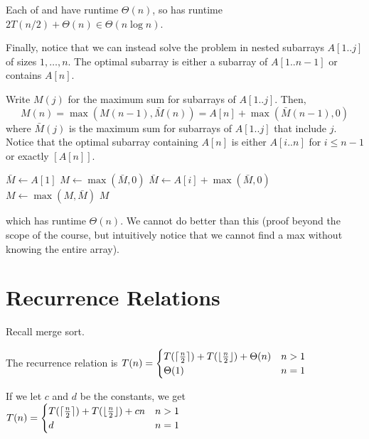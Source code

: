 Each of  and  have runtime $\Theta(n)$,
so  has runtime $2T(n/2) + \Theta(n) \in \Theta(n\log n)$.

Finally, notice that we can instead solve the problem in nested subarrays $A[1..j]$ of sizes $1,\dotsc,n$.
The optimal subarray is either a subarray of $A[1..n-1]$ or contains $A[n]$.

Write $M(j)$ for the maximum sum for subarrays of $A[1..j]$. Then,
\[ M(n) = \max(M(n-1), \bar M(n)) = A[n] + \max(\bar M(n-1), 0) \]
where $\bar M(j)$ is the maximum sum for subarrays of $A[1..j]$ that include $j$.
Notice that the optimal subarray containing $A[n]$ is either $A[i..n]$ for $i \leq n-1$
or exactly $[A[n]]$.

\begin{algorithm}[H]
  \caption{}
  \begin{algorithmic}[1]
    \State $\bar M \gets A[1]$
    \State $M \gets \max(\bar M, 0)$
      \State $\bar M \gets A[i] + \max(\bar M, 0)$
      \State $M \gets \max(M, \bar M)$
    \EndFor
    \State \Return $M$
  \end{algorithmic}
\end{algorithm}

which has runtime $\Theta(n)$.
We cannot do better than this (proof beyond the scope of the course,
but intuitively notice that we cannot find a max without knowing the entire array).

\section{Recurrence Relations}

Recall merge sort.

The recurrence relation is $T(n) = \begin{cases}
    T(\lceil\frac{n}{2}\rceil) + T(\lfloor\frac{n}{2}\rfloor) + \Theta(n) & n > 1 \\
    \Theta(1)                                                  & n = 1
  \end{cases}$

If we let $c$ and $d$ be the constants, we get $T(n) = \begin{cases}
    T(\lceil\frac{n}{2}\rceil) + T(\lfloor\frac{n}{2}\rfloor) + cn & n > 1 \\
    d                                                   & n = 1
  \end{cases}$

